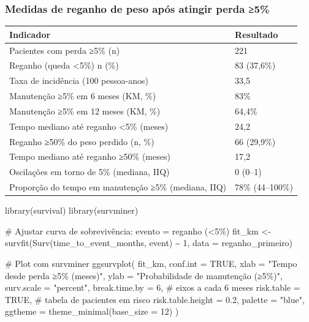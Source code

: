 \documentclass[
]{article}
\newenvironment{Shaded}{\begin{snugshade}}{\end{snugshade}}
\newcommand{\AttributeTok}[1]{\textcolor[rgb]{0.40,0.45,0.13}{#1}}
\newcommand{\CommentTok}[1]{\textcolor[rgb]{0.37,0.37,0.37}{#1}}
\newcommand{\ConstantTok}[1]{\textcolor[rgb]{0.56,0.35,0.01}{#1}}
\newcommand{\DecValTok}[1]{\textcolor[rgb]{0.68,0.00,0.00}{#1}}
\newcommand{\FloatTok}[1]{\textcolor[rgb]{0.68,0.00,0.00}{#1}}
\newcommand{\FunctionTok}[1]{\textcolor[rgb]{0.28,0.35,0.67}{#1}}
\newcommand{\NormalTok}[1]{\textcolor[rgb]{0.00,0.23,0.31}{#1}}
\newcommand{\OtherTok}[1]{\textcolor[rgb]{0.00,0.23,0.31}{#1}}
\newcommand{\SpecialCharTok}[1]{\textcolor[rgb]{0.37,0.37,0.37}{#1}}
\newcommand{\StringTok}[1]{\textcolor[rgb]{0.13,0.47,0.30}{#1}}
\begin{document}
\subsubsection{Medidas de reganho de peso após atingir perda
≥5\%}\label{medidas-de-reganho-de-peso-apuxf3s-atingir-perda-5}

\begin{longtable}[]{@{}ll@{}}
\toprule\noalign{}
Indicador & Resultado \\
\midrule\noalign{}
\endhead
\bottomrule\noalign{}
\endlastfoot
Pacientes com perda ≥5\% (n) & 221 \\
Reganho (queda \textless5\%) n (\%) & 83 (37,6\%) \\
Taxa de incidência (100 pessoa-anos) & 33,5 \\
Manutenção ≥5\% em 6 meses (KM, \%) & 83\% \\
Manutenção ≥5\% em 12 meses (KM, \%) & 64,4\% \\
Tempo mediano até reganho \textless5\% (meses) & 24,2 \\
Reganho ≥50\% do peso perdido (n, \%) & 66 (29,9\%) \\
Tempo mediano até reganho ≥50\% (meses) & 17,2 \\
Oscilações em torno de 5\% (mediana, IIQ) & 0 (0--1) \\
Proporção do tempo em manutenção ≥5\% (mediana, IIQ) & 78\%
(44--100\%) \\
\end{longtable}

\begin{Shaded}
\begin{Highlighting}[]
\FunctionTok{library}\NormalTok{(survival)}
\FunctionTok{library}\NormalTok{(survminer)}

\CommentTok{\# Ajustar curva de sobrevivência: evento = reganho (\textless{}5\%)}
\NormalTok{fit\_km }\OtherTok{\textless{}{-}} \FunctionTok{survfit}\NormalTok{(}\FunctionTok{Surv}\NormalTok{(time\_to\_event\_months, event) }\SpecialCharTok{\textasciitilde{}} \DecValTok{1}\NormalTok{, }\AttributeTok{data =}\NormalTok{ reganho\_primeiro)}

\CommentTok{\# Plot com survminer}
\FunctionTok{ggsurvplot}\NormalTok{(}
\NormalTok{  fit\_km,}
  \AttributeTok{conf.int =} \ConstantTok{TRUE}\NormalTok{,}
  \AttributeTok{xlab =} \StringTok{"Tempo desde perda ≥5\% (meses)"}\NormalTok{,}
  \AttributeTok{ylab =} \StringTok{"Probabilidade de manutenção (≥5\%)"}\NormalTok{,}
  \AttributeTok{surv.scale =} \StringTok{"percent"}\NormalTok{,}
  \AttributeTok{break.time.by =} \DecValTok{6}\NormalTok{,     }\CommentTok{\# eixos a cada 6 meses}
  \AttributeTok{risk.table =} \ConstantTok{TRUE}\NormalTok{,     }\CommentTok{\# tabela de pacientes em risco}
  \AttributeTok{risk.table.height =} \FloatTok{0.2}\NormalTok{,}
  \AttributeTok{palette =} \StringTok{"blue"}\NormalTok{,}
  \AttributeTok{ggtheme =} \FunctionTok{theme\_minimal}\NormalTok{(}\AttributeTok{base\_size =} \DecValTok{12}\NormalTok{)}
\NormalTok{)}
\end{Highlighting}
\end{Shaded}
\end{document}
